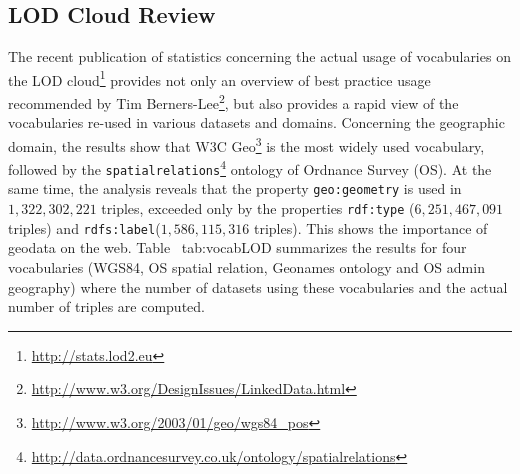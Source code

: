 \documentclass[a4paper,11pt]{report}
\begin{document}
\subsection{LOD Cloud Review}
The recent publication of statistics concerning the actual usage of vocabularies on the LOD cloud\footnote{\url{http://stats.lod2.eu}} provides not only an overview of best practice usage recommended by Tim Berners-Lee\footnote{\url{http://www.w3.org/DesignIssues/LinkedData.html}}, but also provides a rapid view of the vocabularies re-used in various datasets and domains. Concerning the geographic domain, the results show that W3C Geo\footnote{\url{http://www.w3.org/2003/01/geo/wgs84_pos}} is the most widely used vocabulary, followed by the \texttt{spatialrelations}\footnote{\url{http://data.ordnancesurvey.co.uk/ontology/spatialrelations}} ontology of Ordnance Survey (OS). At the same time, the analysis reveals that the property \texttt{geo:geometry} is used in $1,322,302,221$ triples, exceeded only by the properties \texttt{rdf:type} ($6,251,467,091$ triples) and \texttt{rdfs:label}($1,586,115,316$ triples). This shows the importance of geodata on the web. Table~
{tab:vocabLOD} summarizes the results for four vocabularies (WGS84, OS spatial relation, Geonames ontology and OS admin geography) where the number of datasets using these vocabularies and the actual number of triples are computed.
\begin{table}[!htbp]
\end{table}
\end{document}
